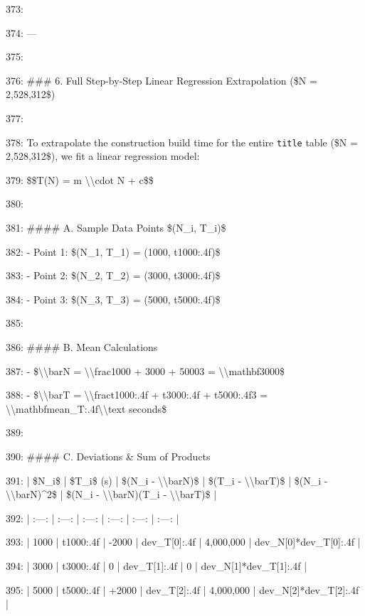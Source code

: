 \documentclass[11pt,a4paper]{article}
\begin{document}
373:

374: ---

375:

376: \#\#\# 6. Full Step-by-Step Linear Regression Extrapolation (\$N = 2,528,312\$)

377:

378: To extrapolate the construction build time for the entire \texttt{title} table (\$N = 2,528,312\$), we fit a linear regression model:

379: \$\$T(N) = m \textbackslash{}\textbackslash{}cdot N + c\$\$

380:

381: \#\#\#\# A. Sample Data Points \$(N\_i, T\_i)\$

382: - Point 1: \$(N\_1, T\_1) = (1000, {t1000:.4f})\$

383: - Point 2: \$(N\_2, T\_2) = (3000, {t3000:.4f})\$

384: - Point 3: \$(N\_3, T\_3) = (5000, {t5000:.4f})\$

385:

386: \#\#\#\# B. Mean Calculations

387: - \$\textbackslash{}\textbackslash{}bar{{N}} = \textbackslash{}\textbackslash{}frac{{1000 + 3000 + 5000}}{{3}} = \textbackslash{}\textbackslash{}mathbf{{3000}}\$

388: - \$\textbackslash{}\textbackslash{}bar{{T}} = \textbackslash{}\textbackslash{}frac{{{t1000:.4f} + {t3000:.4f} + {t5000:.4f}}}{{3}} = \textbackslash{}\textbackslash{}mathbf{{{mean\_T:.4f}\textbackslash{}\textbackslash{}text{{ seconds}}}}\$

389:

390: \#\#\#\# C. Deviations \& Sum of Products

391: | \$N\_i\$ | \$T\_i\$ (s) | \$(N\_i - \textbackslash{}\textbackslash{}bar{{N}})\$ | \$(T\_i - \textbackslash{}\textbackslash{}bar{{T}})\$ | \$(N\_i - \textbackslash{}\textbackslash{}bar{{N}})\textasciicircum{}2\$ | \$(N\_i - \textbackslash{}\textbackslash{}bar{{N}})(T\_i - \textbackslash{}\textbackslash{}bar{{T}})\$ |

392: | :---: | :---: | :---: | :---: | :---: | :---: |

393: | 1000 | {t1000:.4f} | -2000 | {dev\_T[0]:.4f} | 4,000,000 | {dev\_N[0]*dev\_T[0]:.4f} |

394: | 3000 | {t3000:.4f} | 0 | {dev\_T[1]:.4f} | 0 | {dev\_N[1]*dev\_T[1]:.4f} |

395: | 5000 | {t5000:.4f} | +2000 | {dev\_T[2]:.4f} | 4,000,000 | {dev\_N[2]*dev\_T[2]:.4f} |
\end{document}
